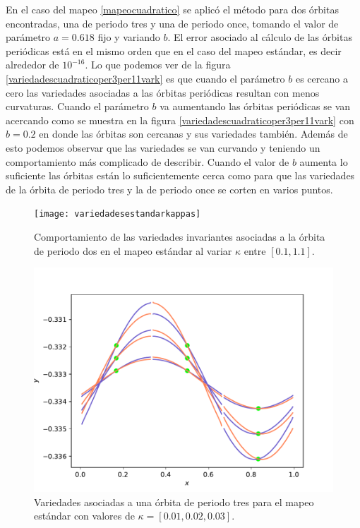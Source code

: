 En el caso del mapeo \eqref{mapeocuadratico} se aplic\'o el m\'etodo para dos \'orbitas encontradas, una de periodo tres y una de periodo once, tomando el valor de par\'ametro $a=0.618$  fijo y variando $b$. El error asociado al c\'alculo de las \'orbitas peri\'odicas est\'a en el mismo orden que en el caso del mapeo est\'andar, es decir alrededor de $10^{-16}$. Lo que podemos ver de la figura \ref{variedadescuadraticoper3per11vark} es que cuando el par\'ametro $b$ es cercano a cero las variedades asociadas a las \'orbitas peri\'odicas resultan con menos curvaturas. Cuando el par\'ametro $b$ va aumentando las \'orbitas peri\'odicas se van acercando como se muestra en la figura \ref{variedadescuadraticoper3per11vark} con $b=0.2$ en donde las \'orbitas son cercanas y sus variedades tambi\'en. Adem\'as de esto podemos observar que las variedades se van curvando y teniendo un comportamiento m\'as complicado de describir. Cuando el valor de $b$ aumenta lo suficiente las \'orbitas est\'an lo suficientemente cerca como para que las variedades de la \'orbita de periodo tres y la de periodo once se corten en varios puntos. \\


\begin{figure}[H]
	\centering
	\texttt{[image: variedadesestandarkappas]}
	\caption{Comportamiento de las variedades invariantes asociadas a la \'orbita de periodo dos en el mapeo est\'andar al variar $\kappa$ entre $[0.1,1.1]$.}
	\label{variedadesestandarkappasv}
\end{figure}

\begin{figure}[H]
	\centering
	\includegraphics[scale=0.5]{variedadesestperiodo3kvar}
	\caption{Variedades asociadas a una \'orbita de periodo tres para el mapeo est\'andar con valores de $\kappa = [0.01,0.02,0.03]$. }
	\label{vairedadesperiodo3kvariable}
\end{figure}

